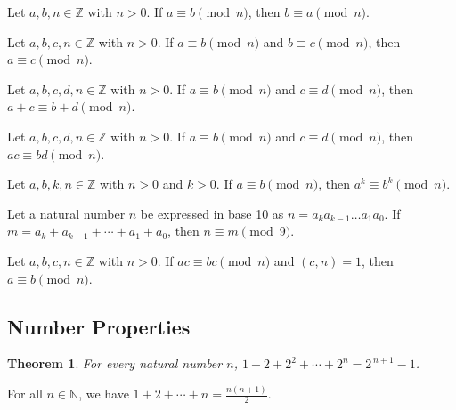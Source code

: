 \documentclass{article}
\newtheorem*{theorem*}{Theorem}
\theoremstyle{definition}
\newenvironment{manualtheorem}[1]{%
  \renewcommand{\thetheorem}{#1}%
  \theorem%
}{%
  \endtheorem%
}
\begin{document}
\begin{manualtheorem}{1.10}
	Let $a, b, n \in \mathbb{Z}$ with $n > 0$. If $a \equiv b \pmod{n}$, then $b \equiv a \pmod{n}$.
\end{manualtheorem}

\begin{manualtheorem}{1.11}
	Let $a, b, c, n \in \mathbb{Z}$ with $n > 0$. If $a \equiv b \pmod{n}$ and $b \equiv c \pmod{n}$, then $a \equiv c \pmod{n}$.
\end{manualtheorem}

\begin{manualtheorem}{1.12}
	Let $a, b, c, d, n \in \mathbb{Z}$ with $n > 0$. If $a \equiv b \pmod{n}$ and $c \equiv d \pmod{n}$, then $a + c \equiv b + d \pmod{n}$.
\end{manualtheorem}

\begin{manualtheorem}{1.14}
	Let $a, b, c, d, n \in \mathbb{Z}$ with $n > 0$. If $a \equiv b \pmod{n}$ and $c \equiv d \pmod{n}$, then $ac \equiv bd \pmod{n}$.
\end{manualtheorem}

\begin{manualtheorem}{1.18}
	Let $a, b, k, n \in \mathbb{Z}$ with $n > 0$ and $k > 0$. If $a \equiv b \pmod{n}$, then $a^k \equiv b^k \pmod{n}$.
\end{manualtheorem}

\begin{manualtheorem}{1.21}
	Let a natural number $n$ be expressed in base 10 as $n = a_ka_{k-1}\ldots a_1a_0$. If $m = a_k + a_{k-1} + \cdots + a_1 + a_0$, then $n \equiv m \pmod{9}$.
\end{manualtheorem}

\begin{manualtheorem}{1.45}
	Let $a, b, c, n \in \mathbb{Z}$ with $n>0$. If $ac \equiv bc \pmod{n}$ and $(c,n)=1$, then $a \equiv b \pmod{n}$.
\end{manualtheorem}


\subsection{Number Properties}
\begin{theorem*}
	For every natural number $n$, $1 + 2 + 2^{2} + \cdots + 2^{n} = 2^{\,n+1}-1$.
\end{theorem*}

\begin{manualtheorem}{A.1}
	For all $n \in \mathbb{N}$, we have $1 + 2 + \cdots + n = \frac{n(n+1)}{2}$.
\end{manualtheorem}
\end{document}
